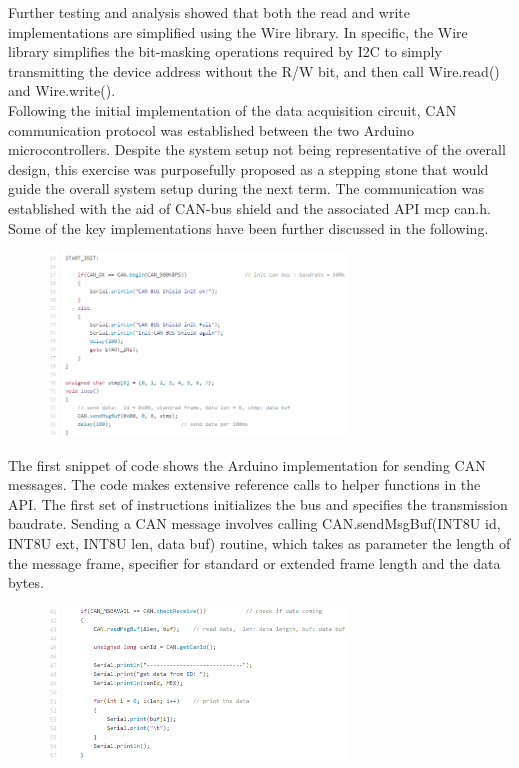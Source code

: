 \documentclass{article}
\begin{document}
\noindent Further testing and analysis showed that both the read and write implementations are simplified using the Wire library. In specific, the Wire library simplifies the bit-masking operations required by I2C to simply transmitting the device address without the R/W bit, and then call Wire.read() and Wire.write(). \\

\noindent Following the initial implementation of the data acquisition circuit, CAN communication protocol was established between the two Arduino microcontrollers. Despite the system setup not being representative of the overall design, this exercise was purposefully proposed as a stepping stone that would guide the overall system setup during the next term. The communication was established with the aid of CAN-bus shield and the associated API mcp can.h. Some of the key implementations have been further discussed in the following. \\

\begin{figure}[!ht]
\centering 
\includegraphics[width=8cm]{4.png}
\end{figure}

\noindent The first snippet of code shows the Arduino implementation for sending CAN messages. The code makes extensive reference calls to helper functions in the API. The first set of instructions initializes the bus and specifies the transmission baudrate. Sending a CAN message involves calling CAN.sendMsgBuf(INT8U id, INT8U ext, INT8U len, data buf) routine, which takes as parameter the length of the message frame, specifier for standard or extended frame length and the data bytes. \\

\begin{figure}[!ht]
\centering 
\includegraphics[width=8cm]{5.png}
\end{figure}
\end{document}
